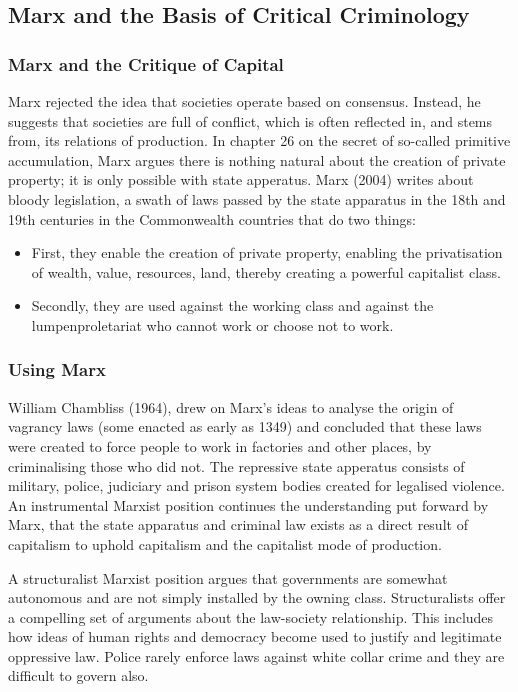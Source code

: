 \documentclass{article}
\begin{document}
\subsection{Marx and the Basis of Critical Criminology}

\subsubsection*{Marx and the Critique of Capital}

Marx rejected the idea that societies operate based on consensus. Instead, he suggests that societies are full of conflict, which is often reflected in, and stems from, its relations of production. In chapter 26 on the secret of so-called primitive accumulation, Marx argues there is nothing natural about the creation of private property; it is only possible with state apperatus. Marx (2004) writes about bloody legislation, a swath of laws passed by the state apparatus in the 18th and 19th centuries in the Commonwealth countries that do two things:

\begin{itemize}
    \item First, they enable the creation of private property, enabling the privatisation of wealth, value, resources, land, thereby creating a powerful capitalist class.
    \item Secondly, they are used against the working class and against the lumpenproletariat who cannot work or choose not to work.
\end{itemize}

\subsubsection*{Using Marx}

William Chambliss (1964), drew on Marx’s ideas to analyse the origin of vagrancy laws (some enacted as early as 1349) and concluded that these laws were created to force people to work in factories and other places, by criminalising those who did not. The repressive state apperatus consists of military, police, judiciary and prison system bodies created for legalised violence. An instrumental Marxist position continues the understanding put forward by Marx, that the state apparatus and criminal law exists as a direct result of capitalism to uphold capitalism and the capitalist mode of production. 

A structuralist Marxist position argues that governments are somewhat autonomous and are not simply installed by the owning class. Structuralists offer a compelling set of arguments about the law-society relationship. This includes how ideas of human rights and democracy become used to justify and legitimate oppressive law. Police rarely enforce laws against white collar crime and they are difficult to govern also.
\end{document}
